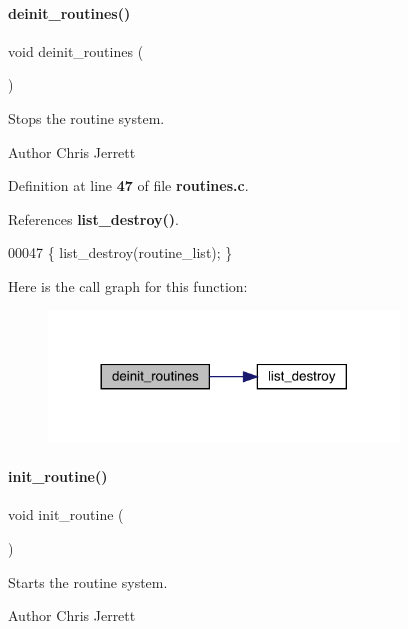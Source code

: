 \paragraph{deinit\+\_\+routines()}
{\footnotesize\ttfamily void deinit\+\_\+routines (\begin{DoxyParamCaption}{ }\end{DoxyParamCaption})}



Stops the routine system. 

\begin{DoxyAuthor}{Author}
Chris Jerrett 
\end{DoxyAuthor}


Definition at line \textbf{ 47} of file \textbf{ routines.\+c}.



References \textbf{ list\+\_\+destroy()}.


\begin{DoxyCode}
00047 \{ list_destroy(routine_list); \}
\end{DoxyCode}
Here is the call graph for this function\+:\nopagebreak
\begin{figure}[H]
\begin{center}
\leavevmode
\includegraphics[width=264pt]{routines_8c_ad908adbc884189372f72f882ec62d71d_cgraph}
\end{center}
\end{figure}
\mbox{\label{routines_8c_ab873e24fcc59a2bf7844618b664a5d26}} 
\paragraph{init\+\_\+routine()}
{\footnotesize\ttfamily void init\+\_\+routine (\begin{DoxyParamCaption}{ }\end{DoxyParamCaption})}



Starts the routine system. 

\begin{DoxyAuthor}{Author}
Chris Jerrett 
\end{DoxyAuthor}


